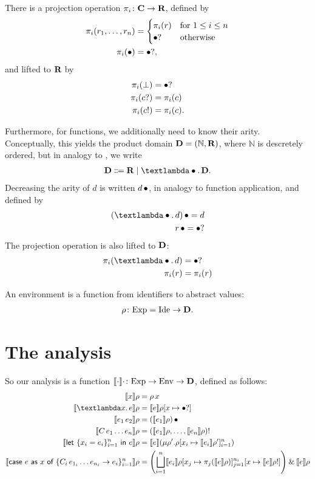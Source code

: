 \documentclass[parskip=half]{scrartcl}
\newcommand{\sIde}{\text{Ide}}
\newcommand{\sExp}{\text{Exp}}
\newcommand{\sEnv}{\text{Env}}
\newcommand{\sem}[2]{\llbracket #1\rrbracket #2}
\newcommand{\sApp}[2]{#1\,#2}
\newcommand{\sLam}[2]{\text{\textlambda} #1.\, #2}
\newcommand{\sCase}[4]{\text{\textsf{case}}\ #1\  \textsf{as}\ #2\ \textsf{of}\ \{#3 \rightarrow #4\}_{i=1}^n}
\newcommand{\sLet}[3]{\text{\textsf{let}}\ \{#1 = #2\}_{i=1}^n\ \text{\textsf{in}}\ #3}
\newcommand{\both}[2]{#1\mathbin{\&}#2}
\begin{document}
There is a projection operation $\pi_i \colon \textbf{C} \to \textbf{R}$, defined by
\begin{align*}
\pi_i(r_1,\ldots,r_n) &=
\begin{cases}
\pi_i (r) & \text{for $1 \le i \le n$}\\
\bullet? & \text{otherwise}
\end{cases}\\
\pi_i(\bullet) &= \bullet?,
\end{align*}
and lifted to $\textbf{R}$ by
\begin{align*}
\pi_i(\bot) &= \bullet?\\
\pi_i(c?) &= \pi_i(c) \\
\pi_i(c!) &= \pi_i(c).
\end{align*}

Furthermore, for functions, we additionally need to know their arity. Conceptually, this yields the product domain $\textbf{D}=(\mathbb N, \textbf{R})$, where $\mathbb N$ is descretely ordered, but in analogy to \citep{cpr}, we write
\begin{align*}
\dD \Coloneqq \dR \mid \dLam\dD.
\end{align*}
Decreasing the arity of $d$ is written $\dApp d$, in analogy to function application, and defined by
\begin{align*}
\dApp{(\dLam d)} = d\\
\dApp{r} = \dunno\noCPR
\end{align*}
The projection operation is also lifted to $\textbf{D}$:
\begin{align*}
\pi_i(\dLam{d}) &= \dunno\noCPR\\
\pi_i(r) &= \pi_i(r) \\
\end{align*}


An environment is a function from identifiers to abstract values:
\begin{align*}
\rho \colon \sExp = \sIde \to \dD.
\end{align*}

\section{The analysis}

So our analysis is a function $\sem{\cdot}\cdot \colon \sExp \to \sEnv \to \dD$, defined as follows:
%
\newcommand{\upd}[3]{#1[#2 \mapsto #3]}
%
\begin{align*}
\sem{x}\rho &= \sApp \rho x \\
\sem{\sLam x e}\rho &= \sem e{\upd\rho x{\dunno\noCPR}} \\
\sem{\sApp {e_1} {e_2}}\rho &= \dApp{(\sem{e_1}\rho)} \\
\sem{\sApp C {e_1\ldots e_n}}\rho &= \conv{(\sem{e_1}\rho, \ldots, \sem{e_n}\rho)} \\
\sem{\sLet {x_i}{e_i} e}\rho &= \sem{e}({\mu \rho'. \upd\rho{x_i}{\sem{e_i}{\rho'}}_{i=1}^n})\\
\sem{\sCase e x {\sApp {C_i} {e_{1_i}\ldots e_{n_i}}} {e_i}}\rho
	&= \both{\left(
	     \bigsqcup_{i=1}^n \sem{e_i}{
		\upd{\upd\rho{x_j}{ \pi_j(\sem{e}\rho) }_{j=1}^{n_i}}}
		    {x}{\conv{\sem{e}\rho}}
	   \right)}{\sem{e}\rho}
\end{align*}
\end{document}
